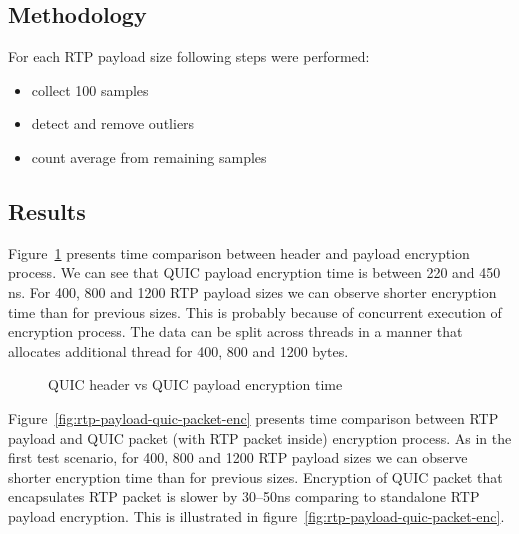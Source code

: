 \subsection{Methodology}
\label{subsec:methodology}
For each RTP payload size following steps were performed:
\begin{itemize}
    \item collect 100 samples
    \item detect and remove outliers
    \item count average from remaining samples
\end{itemize}

\subsection{Results}
\label{subsec:results}
Figure~\ref{fig:header-payload-enc} presents time comparison between header and payload encryption process.
We can see that QUIC payload encryption time is between 220 and 450 ns.
For 400, 800 and 1200 RTP payload sizes we can observe shorter encryption time than for previous sizes.
This is probably because of concurrent execution of encryption process.
The data can be split across threads in a manner that allocates additional thread for 400, 800 and 1200 bytes.

\begin{figure}[h]
    \centering
    \caption{QUIC header vs QUIC payload encryption time}
    \label{fig:header-payload-enc}
\end{figure}

Figure~\ref{fig:rtp-payload-quic-packet-enc} presents time comparison between RTP payload and QUIC packet (with RTP packet inside) encryption process.
As in the first test scenario, for 400, 800 and 1200 RTP payload sizes we can observe shorter encryption time than for previous sizes.
Encryption of QUIC packet that encapsulates RTP packet is slower by 30--50ns comparing to standalone RTP payload encryption.
This is illustrated in figure~\ref{fig:rtp-payload-quic-packet-enc}.

